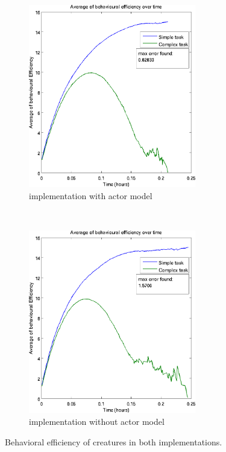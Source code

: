 \documentclass{aamas2017}
\begin{document}
\begin{figure}[t]
	\centering
	\begin{subfigure}[t]{0.5\textwidth}
		\centering
		\includegraphics[height=8cm]{images/efficienceAkka}
		\caption{implementation with actor model}
		\label{fig:behaviorWithAkka}
	\end{subfigure}%
	~ 
	\begin{subfigure}[t]{0.5\textwidth}
		\centering
		\includegraphics[height=8cm]{images/efficienceNoAkka}
		\caption{implementation without actor model}
		\label{fig:behaviorWithout}
	\end{subfigure}
	\caption{Behavioral efficiency of creatures in both implementations. }
	\label{behavior}
\end{figure}

\FloatBarrier


\end{document}

